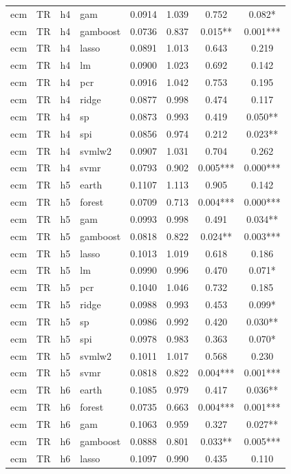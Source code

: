 \begin{ThreePartTable}
\begin{longtable}[t]{llclcccc}
ecm & TR & h4 & gam & 0.0914 & 1.039 & 0.752 & 0.082*\\
ecm & TR & h4 & gamboost & 0.0736 & 0.837 & 0.015** & 0.001***\\
ecm & TR & h4 & lasso & 0.0891 & 1.013 & 0.643 & 0.219\\
ecm & TR & h4 & lm & 0.0900 & 1.023 & 0.692 & 0.142\\
ecm & TR & h4 & pcr & 0.0916 & 1.042 & 0.753 & 0.195\\
ecm & TR & h4 & ridge & 0.0877 & 0.998 & 0.474 & 0.117\\
ecm & TR & h4 & sp & 0.0873 & 0.993 & 0.419 & 0.050**\\
ecm & TR & h4 & spi & 0.0856 & 0.974 & 0.212 & 0.023**\\
ecm & TR & h4 & svmlw2 & 0.0907 & 1.031 & 0.704 & 0.262\\
ecm & TR & h4 & svmr & 0.0793 & 0.902 & 0.005*** & 0.000***\\
\addlinespace
ecm & TR & h5 & earth & 0.1107 & 1.113 & 0.905 & 0.142\\
ecm & TR & h5 & forest & 0.0709 & 0.713 & 0.004*** & 0.000***\\
ecm & TR & h5 & gam & 0.0993 & 0.998 & 0.491 & 0.034**\\
ecm & TR & h5 & gamboost & 0.0818 & 0.822 & 0.024** & 0.003***\\
ecm & TR & h5 & lasso & 0.1013 & 1.019 & 0.618 & 0.186\\
ecm & TR & h5 & lm & 0.0990 & 0.996 & 0.470 & 0.071*\\
ecm & TR & h5 & pcr & 0.1040 & 1.046 & 0.732 & 0.185\\
ecm & TR & h5 & ridge & 0.0988 & 0.993 & 0.453 & 0.099*\\
ecm & TR & h5 & sp & 0.0986 & 0.992 & 0.420 & 0.030**\\
ecm & TR & h5 & spi & 0.0978 & 0.983 & 0.363 & 0.070*\\
ecm & TR & h5 & svmlw2 & 0.1011 & 1.017 & 0.568 & 0.230\\
ecm & TR & h5 & svmr & 0.0818 & 0.822 & 0.004*** & 0.001***\\
\addlinespace
ecm & TR & h6 & earth & 0.1085 & 0.979 & 0.417 & 0.036**\\
ecm & TR & h6 & forest & 0.0735 & 0.663 & 0.004*** & 0.001***\\
ecm & TR & h6 & gam & 0.1063 & 0.959 & 0.327 & 0.027**\\
ecm & TR & h6 & gamboost & 0.0888 & 0.801 & 0.033** & 0.005***\\
ecm & TR & h6 & lasso & 0.1097 & 0.990 & 0.435 & 0.110\\

\end{longtable}
\end{ThreePartTable}

